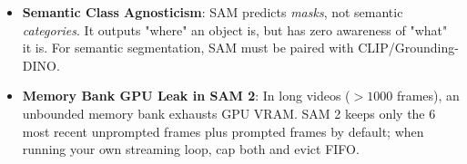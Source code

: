 \begin{trap}
\begin{itemize}
\item \textbf{Semantic Class Agnosticism}: SAM predicts \emph{masks}, not semantic \emph{categories}. It outputs "where" an object is, but has zero awareness of "what" it is. For semantic segmentation, SAM must be paired with CLIP/Grounding-DINO.
\item \textbf{Memory Bank GPU Leak in SAM 2}: In long videos ($>1000$ frames), an unbounded memory bank exhausts GPU VRAM. SAM 2 keeps only the 6 most recent unprompted frames plus prompted frames by default; when running your own streaming loop, cap both and evict FIFO.
\end{itemize}
\end{trap}
